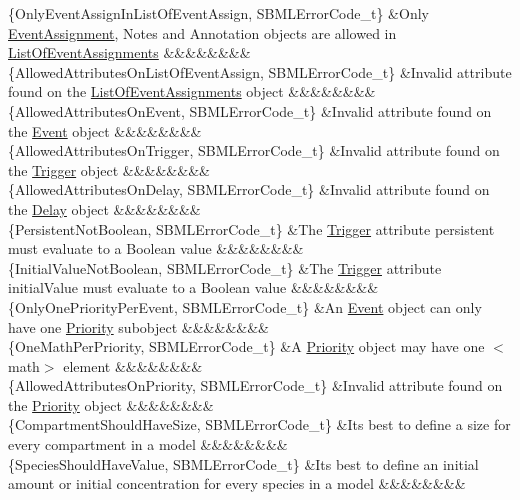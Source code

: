 \begin{DoxyParagraph}{}
\begin{longtabu}
\{Only\+Event\+Assign\+In\+List\+Of\+Event\+Assign, S\+B\+M\+L\+Error\+Code\+\_\+t\} &Only \hyperlink{class_event_assignment}{Event\+Assignment}, Notes and Annotation objects are allowed in \hyperlink{class_list_of_event_assignments}{List\+Of\+Event\+Assignments} &&&&&&&&\\
\{Allowed\+Attributes\+On\+List\+Of\+Event\+Assign, S\+B\+M\+L\+Error\+Code\+\_\+t\} &Invalid attribute found on the \hyperlink{class_list_of_event_assignments}{List\+Of\+Event\+Assignments} object &&&&&&&&\\
\{Allowed\+Attributes\+On\+Event, S\+B\+M\+L\+Error\+Code\+\_\+t\} &Invalid attribute found on the \hyperlink{class_event}{Event} object &&&&&&&&\\
\{Allowed\+Attributes\+On\+Trigger, S\+B\+M\+L\+Error\+Code\+\_\+t\} &Invalid attribute found on the \hyperlink{class_trigger}{Trigger} object &&&&&&&&\\
\{Allowed\+Attributes\+On\+Delay, S\+B\+M\+L\+Error\+Code\+\_\+t\} &Invalid attribute found on the \hyperlink{class_delay}{Delay} object &&&&&&&&\\
\{Persistent\+Not\+Boolean, S\+B\+M\+L\+Error\+Code\+\_\+t\} &The \hyperlink{class_trigger}{Trigger} attribute \textquotesingle{}persistent\textquotesingle{} must evaluate to a Boolean value &&&&&&&&\\
\{Initial\+Value\+Not\+Boolean, S\+B\+M\+L\+Error\+Code\+\_\+t\} &The \hyperlink{class_trigger}{Trigger} attribute \textquotesingle{}initial\+Value\textquotesingle{} must evaluate to a Boolean value &&&&&&&&\\
\{Only\+One\+Priority\+Per\+Event, S\+B\+M\+L\+Error\+Code\+\_\+t\} &An \hyperlink{class_event}{Event} object can only have one \hyperlink{class_priority}{Priority} subobject &&&&&&&&\\
\{One\+Math\+Per\+Priority, S\+B\+M\+L\+Error\+Code\+\_\+t\} &A \hyperlink{class_priority}{Priority} object may have one {\ttfamily $<$math$>$} element &&&&&&&&\\
\{Allowed\+Attributes\+On\+Priority, S\+B\+M\+L\+Error\+Code\+\_\+t\} &Invalid attribute found on the \hyperlink{class_priority}{Priority} object &&&&&&&&\\
\{Compartment\+Should\+Have\+Size, S\+B\+M\+L\+Error\+Code\+\_\+t\} &It\textquotesingle{}s best to define a size for every compartment in a model &&&&&&&&\\
\{Species\+Should\+Have\+Value, S\+B\+M\+L\+Error\+Code\+\_\+t\} &It\textquotesingle{}s best to define an initial amount or initial concentration for every species in a model &&&&&&&&\\

\end{longtabu}
\end{DoxyParagraph}
